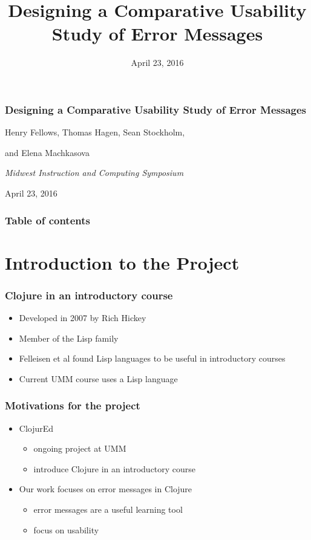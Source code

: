 \documentclass{beamer}
\begin{document}
\title{Designing a Comparative Usability Study of Error Messages}
\date{April 23, 2016}

\begin{frame}
\frametitle{Designing a Comparative Usability Study of Error Messages}
{\centering
\noindent
Henry Fellows, Thomas Hagen, Sean Stockholm, \par
and Elena Machkasova \par

{\it 
Midwest Instruction and Computing Symposium\par
April 23, 2016\par}
}
\end{frame}

\begin{frame}
\frametitle{Table of contents}
\tableofcontents  
\end{frame}

\section{Introduction to the Project}

\begin{frame}
	\frametitle{Clojure in an introductory course}
	\begin{itemize}
		\item Developed in 2007 by Rich Hickey
		\item Member of the Lisp family
		\item Felleisen et al found Lisp languages to be useful in introductory courses
		\item Current UMM course uses a Lisp language
	\end{itemize}
\end{frame}

\begin{frame}
\frametitle{Motivations for the project}
	\begin{itemize}
		\item ClojurEd
			\begin{itemize}
				\item ongoing project at UMM
				\item introduce Clojure in an introductory course
			\end{itemize}
		\item Our work focuses on error messages in Clojure
			\begin{itemize}
				\item error messages are a useful learning tool
				\item focus on usability
			\end{itemize}
	\end{itemize}
\end{frame}
\end{document}
